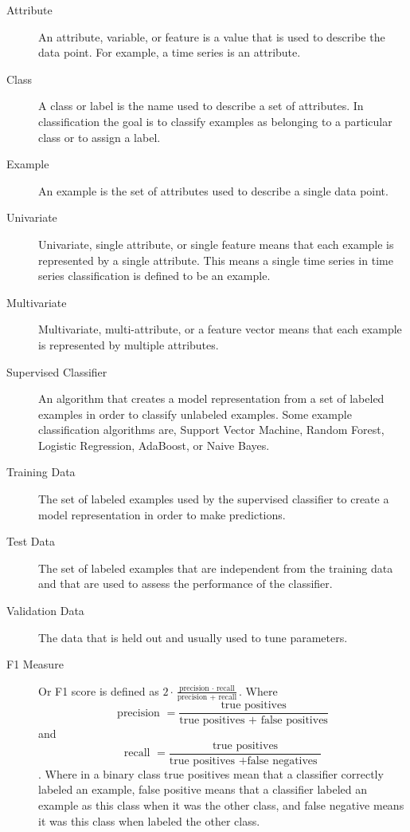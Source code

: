 \documentclass[letterpaper, 12pt]{article}
\begin{document}
\begin{description}
	\item[Attribute] An attribute, variable, or feature is a value that is used to describe the data point.  For example, a time series is an attribute.
	\item[Class] A class or label is the name used to describe a set of attributes.  In classification the goal is to classify examples as belonging to a particular class or to assign a label.
	\item[Example] An example is the set of attributes used to describe a single data point.
	\item[Univariate] Univariate, single attribute, or single feature means that each example is represented by a single attribute.  This means a single time series in time series classification is defined to be an example.
	\item[Multivariate] Multivariate, multi-attribute, or a feature vector means that each example is represented by multiple attributes.
	\item[Supervised Classifier] An algorithm that creates a model representation from a set of labeled examples in order to classify unlabeled examples.  Some example classification algorithms are, Support Vector Machine, Random Forest, Logistic Regression, AdaBoost, or Naive Bayes.
	\item[Training Data] The set of labeled examples used by the supervised classifier to create a model representation in order to make predictions.
	\item[Test Data] The set of labeled examples that are independent from the training data and that are used to assess the performance of the classifier.
	\item[Validation Data] The data that is held out and usually used to tune parameters.
	\item[F1 Measure] Or F1 score is defined as \(2\cdot \frac{\textrm{precision }\cdot \textrm{ recall}}{\textrm{precision }+\textrm{ recall}}\).  Where \[\textrm{precision } = \frac{\textrm{true positives}}{\textrm{true positives } + \textrm{ false positives}}\] and \[\textrm{recall } = \frac{\textrm{true positives}}{\textrm{true positives } + \textrm{false negatives }}\].  Where in a binary class true positives mean that a classifier correctly labeled an example, false positive means that a classifier labeled an example as this class when it was the other class, and false negative means it was this class when labeled the other class.
\end{description}
\end{document}

